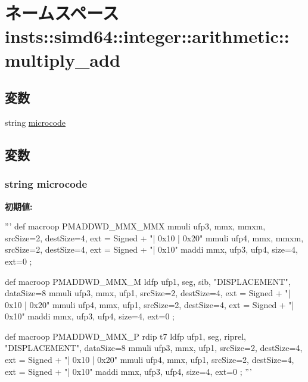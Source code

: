\hypertarget{namespaceinsts_1_1simd64_1_1integer_1_1arithmetic_1_1multiply__add}{
\section{ネームスペース insts::simd64::integer::arithmetic::multiply\_\-add}
\label{namespaceinsts_1_1simd64_1_1integer_1_1arithmetic_1_1multiply__add}
}
\subsection*{変数}
\begin{DoxyCompactItemize}
\item 
string \hyperlink{namespaceinsts_1_1simd64_1_1integer_1_1arithmetic_1_1multiply__add_a770f11a173e99389a8802f0107ed8f52}{microcode}
\end{DoxyCompactItemize}


\subsection{変数}
\hypertarget{namespaceinsts_1_1simd64_1_1integer_1_1arithmetic_1_1multiply__add_a770f11a173e99389a8802f0107ed8f52}{
\subsubsection[{microcode}]{\setlength{\rightskip}{0pt plus 5cm}string {\bf microcode}}}
\label{namespaceinsts_1_1simd64_1_1integer_1_1arithmetic_1_1multiply__add_a770f11a173e99389a8802f0107ed8f52}
{\bfseries 初期値:}
\begin{DoxyCode}
'''
def macroop PMADDWD_MMX_MMX {
    mmuli ufp3, mmx, mmxm, srcSize=2, destSize=4, ext = Signed + "| 0x10 | 0x20"
    mmuli ufp4, mmx, mmxm, srcSize=2, destSize=4, ext = Signed + "| 0x10"
    maddi mmx, ufp3, ufp4, size=4, ext=0
};

def macroop PMADDWD_MMX_M {
    ldfp ufp1, seg, sib, "DISPLACEMENT", dataSize=8
    mmuli ufp3, mmx, ufp1, srcSize=2, destSize=4, ext = Signed + "| 0x10 | 0x20"
    mmuli ufp4, mmx, ufp1, srcSize=2, destSize=4, ext = Signed + "| 0x10"
    maddi mmx, ufp3, ufp4, size=4, ext=0
};

def macroop PMADDWD_MMX_P {
    rdip t7
    ldfp ufp1, seg, riprel, "DISPLACEMENT", dataSize=8
    mmuli ufp3, mmx, ufp1, srcSize=2, destSize=4, ext = Signed + "| 0x10 | 0x20"
    mmuli ufp4, mmx, ufp1, srcSize=2, destSize=4, ext = Signed + "| 0x10"
    maddi mmx, ufp3, ufp4, size=4, ext=0
};
'''
\end{DoxyCode}
